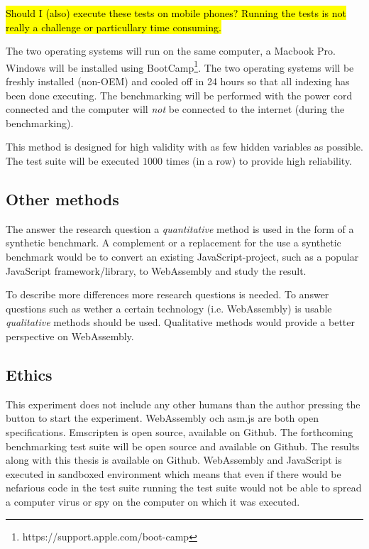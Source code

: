 \hl{Should I (also) execute these tests on mobile phones? Running the tests is not really a challenge or particullary time consuming.}

The two operating systems will run on the same computer, a Macbook Pro. Windows will be installed using BootCamp\footnote{https://support.apple.com/boot-camp}. The two operating systems will be freshly installed (non-OEM) and cooled off in 24 hours so that all indexing has been done executing. The benchmarking will be performed with the power cord connected and the computer will \emph{not} be connected to the internet (during the benchmarking).

This method is designed for high validity with as few hidden variables as possible. The test suite will be executed $1 000$ times (in a row) to provide high reliability.

\subsection*{Other methods}

The answer the research question a \emph{quantitative} method is used in the form of a synthetic benchmark. A complement or a replacement for the use a synthetic benchmark would be to convert an existing JavaScript-project, such as a popular JavaScript framework/library, to WebAssembly and study the result.

To describe more differences more research questions is needed. To answer questions such as wether a certain technology (i.e. WebAssembly) is usable \emph{qualitative} methods should be used. Qualitative methods would provide a better perspective on WebAssembly.

\subsection{Ethics}

This experiment does not include any other humans than the author pressing the button to start the experiment. WebAssembly och asm.js are both open specifications. Emscripten is open source, available on Github. The forthcoming benchmarking test suite will be open source and available on Github. The results along with this thesis is available on Github. WebAssembly and JavaScript is executed in sandboxed environment which means that even if there would be nefarious code in the test suite running the test suite would not be able to spread a computer virus or spy on the computer on which it was executed.

